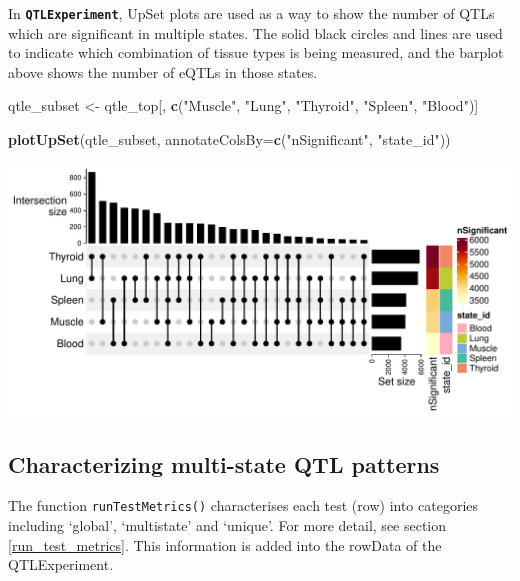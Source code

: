 \documentclass[
]{article}
\newenvironment{Shaded}{\begin{snugshade}}{\end{snugshade}}
\newcommand{\AttributeTok}[1]{\textcolor[rgb]{0.13,0.29,0.53}{#1}}
\newcommand{\FunctionTok}[1]{\textcolor[rgb]{0.13,0.29,0.53}{\textbf{#1}}}
\newcommand{\NormalTok}[1]{#1}
\newcommand{\OtherTok}[1]{\textcolor[rgb]{0.56,0.35,0.01}{#1}}
\newcommand{\SpecialCharTok}[1]{\textcolor[rgb]{0.81,0.36,0.00}{\textbf{#1}}}
\newcommand{\StringTok}[1]{\textcolor[rgb]{0.31,0.60,0.02}{#1}}
\begin{document}
In \textbf{\texttt{QTLExperiment}}, UpSet plots are used as a way to
show the number of QTLs which are significant in multiple states. The
solid black circles and lines are used to indicate which combination of
tissue types is being measured, and the barplot above shows the number
of eQTLs in those states.

\footnotesize

\begin{Shaded}
\begin{Highlighting}[]
\NormalTok{qtle\_subset }\OtherTok{\textless{}{-}}\NormalTok{ qtle\_top[, }\FunctionTok{c}\NormalTok{(}\StringTok{"Muscle"}\NormalTok{, }\StringTok{"Lung"}\NormalTok{, }\StringTok{"Thyroid"}\NormalTok{, }\StringTok{"Spleen"}\NormalTok{, }\StringTok{"Blood"}\NormalTok{)]}

\FunctionTok{plotUpSet}\NormalTok{(qtle\_subset, }\AttributeTok{annotateColsBy=}\FunctionTok{c}\NormalTok{(}\StringTok{"nSignificant"}\NormalTok{, }\StringTok{"state\_id"}\NormalTok{))}
\end{Highlighting}
\end{Shaded}

\includegraphics{GTEx_files/figure-latex/plot-upset-gtex-1.pdf}
\normalsize

\subsection{Characterizing multi-state QTL
patterns}\label{characterizing-multi-state-qtl-patterns}

The function \texttt{runTestMetrics()} characterises each test (row)
into categories including `global', `multistate' and `unique'. For more
detail, see section \ref{run_test_metrics}. This information is added
into the rowData of the QTLExperiment. \footnotesize

\begin{Shaded}
\end{Shaded}
\end{document}
